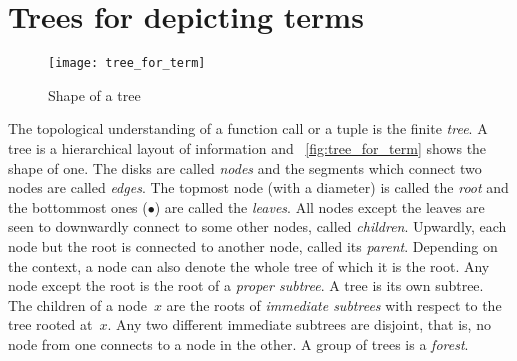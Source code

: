 \section{Trees for depicting terms} 
\label{def:tree}

%
\begin{wrapfigure}[9]{r}[0pt]{0pt}
\centering
\texttt{[image: tree\_for\_term]}%
\caption{Shape of a tree\label{fig:tree_for_term}}
\end{wrapfigure}
The topological understanding of a function call or a tuple is the
finite \emph{tree}. A tree is a hierarchical layout of
information and \fig~\vref{fig:tree_for_term} shows the shape of
one. The disks are called \emph{nodes} and the
segments which connect two nodes are called
\emph{edges}. The topmost node (with a diameter) is
called the \emph{root} and the bottommost ones
(\(\bullet\)) are called the \emph{leaves}. All
nodes except the leaves are seen to downwardly connect to some other
nodes, called \emph{children}. Upwardly, each
node but the root is connected to another node, called its
\emph{parent}. Depending on the context, a
node can also denote the whole tree of which it is the root. Any node
except the root is the root of a \emph{proper
  subtree}. A tree is its own
subtree. The children of a node~\(x\) are the roots of \emph{immediate
  subtrees} with respect to the
tree rooted at~\(x\). Any two different immediate subtrees are
disjoint, that is, no node from one connects to a node in the other. A
group of trees is a \emph{forest}.

